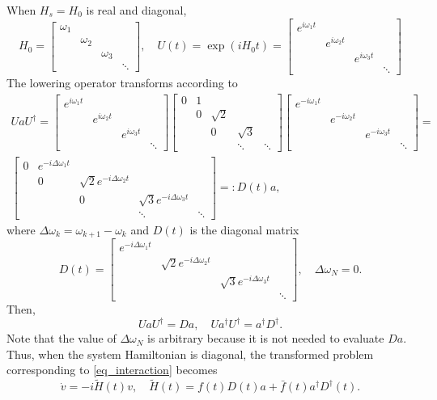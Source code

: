 \documentclass[11pt]{article}
\begin{document}
When $H_s=H_0$ is real and diagonal,
\[
H_0=\begin{bmatrix}
\omega_1 & & &\\
& \omega_2 &&\\
& & \omega_3 &\\
& & & \ddots
\end{bmatrix},\quad
%
U(t) = \exp(i H_0 t)=
\begin{bmatrix}
e^{i\omega_1 t} & & &\\
& e^{i\omega_2 t} &&\\
& & e^{i\omega_3 t} &\\
& & & \ddots
\end{bmatrix}
\]
The lowering operator transforms according to
\begin{multline*}
UaU^\dag =
\begin{bmatrix}
  e^{i\omega_1 t} & & & \\
  & e^{i\omega_2 t} & & \\
  & &  e^{i\omega_3 t} & \\
  & & & \ddots
\end{bmatrix}
\begin{bmatrix}
0 & 1 & & &\\
 & 0 & \sqrt{2} & &\\
&  & 0 & \sqrt{3} &\\
& &  & \ddots & \ddots
\end{bmatrix}
\begin{bmatrix}
  e^{-i\omega_1 t} & & & \\
  & e^{-i\omega_2 t} & & \\
  & &  e^{-i\omega_3 t} & \\
  & & & \ddots
\end{bmatrix} = \\
%
\begin{bmatrix}
0 & e^{-i\Delta\omega_1 t} & & &\\
 & 0 & \sqrt{2} e^{-i\Delta\omega_2 t}& &\\
&  & 0 & \sqrt{3} e^{-i\Delta\omega_3 t}  &\\
& &  & \ddots & \ddots
\end{bmatrix} =: D(t)a,
%
\end{multline*}
where $\Delta\omega_k = \omega_{k+1} - \omega_k$ and $D(t)$ is the diagonal matrix
\[
D(t) = \begin{bmatrix}
 e^{-i\Delta\omega_1 t} & & &\\
  & \sqrt{2} e^{-i\Delta\omega_2 t}& &\\
&  & \sqrt{3} e^{-i\Delta\omega_3 t}  &\\
&  &   & \ddots
\end{bmatrix},\quad \Delta\omega_N = 0.
\]
Then,
\[
UaU^\dag = D a,\quad Ua^\dag U^\dag = a^\dag D^\dag.
\]
Note that the value of $\Delta\omega_N$ is arbitrary because it is not needed to evaluate $D a$.
Thus, when the system Hamiltonian is diagonal, the transformed problem corresponding to \eqref{eq_interaction} becomes 
\begin{equation}
  \dot{v} = -i\widetilde{H}(t) v,\quad \widetilde{H}(t) = f(t) D(t) a + \bar{f}(t) a^\dag D^\dag(t).
\end{equation}
\end{document}
